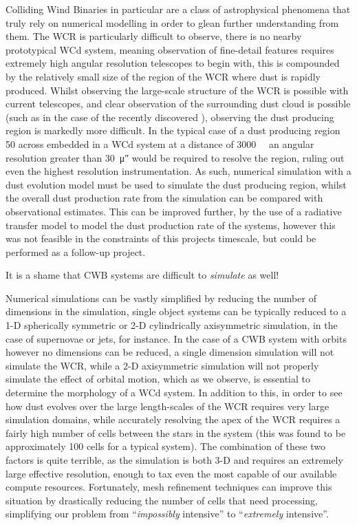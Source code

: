 Colliding Wind Binaries in particular are a class of astrophysical phenomena that truly rely on numerical modelling in order to glean further understanding from them.
The WCR is particularly difficult to observe, there is no nearby prototypical WCd system, meaning observation of fine-detail features requires extremely high angular resolution telescopes to begin with, this is compounded by the relatively small size of the region of the WCR where dust is rapidly produced.
Whilst observing the large-scale structure of the WCR is possible with current telescopes, and clear observation of the surrounding dust cloud is possible (such as in the case of the recently discovered \textcite{callinghamAnisotropicWindsWolf2019}), observing the dust producing region is markedly more difficult.
In the typical case of a dust producing region \SI{50}{\au} across embedded in a WCd system at a distance of \SI{3000}{\kilo\parsec} an angular resolution greater than \SI{30}{\micro\arcsecond} would be required to resolve the region, ruling out even the highest resolution instrumentation.
As such, numerical simulation with a dust evolution model must be used to simulate the dust producing region, whilst the overall dust production rate from the simulation can be compared with observational estimates.
This can be improved further, by the use of a radiative transfer model to model the dust production rate of the systems, however this was not feasible in the constraints of this projects timescale, but could be performed as a follow-up project.


It is a shame that CWB systems are difficult to \textit{simulate} as well!

Numerical simulations can be vastly simplified by reducing the number of dimensions in the simulation, single object systems can be typically reduced to a 1-D spherically symmetric or 2-D cylindrically axisymmetric simulation, in the case of supernovae or jets, for instance.
In the case of a CWB system with orbits however no dimensions can be reduced, a single dimension simulation will not simulate the WCR, while a 2-D axisymmetric simulation will not properly simulate the effect of orbital motion, which as we observe, is essential to determine the morphology of a WCd system.
In addition to this, in order to see how dust evolves over the large length-scales of the WCR requires very large simulation domains, while accurately resolving the apex of the WCR requires a fairly high number of cells between the stars in the system (this was found to be approximately 100 cells for a typical system).
The combination of these two factors is quite terrible, as the simulation is both 3-D and requires an extremely large effective resolution, enough to tax even the most capable of our available compute resources.
Fortunately, mesh refinement techniques can improve this situation by drastically reducing the number of cells that need processing, simplifying our problem from ``\textit{impossibly} intensive'' to ``\textit{extremely} intensive''.

